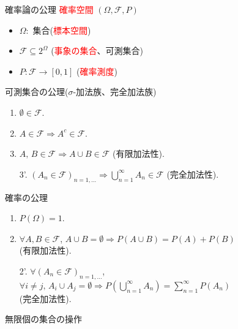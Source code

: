 \documentclass[lualatex,handout]{beamer}
\newcommand{\emm}[1]{\textcolor{red}{#1}}
\theoremstyle{definition}
\begin{document}
\begin{frame}{確率論の公理}
\emm{確率空間} $(\Omega, \mathcal{F}, P)$

\vspace{.5em}
\begin{itemize}
\item $\Omega\colon$ 集合(\emm{標本空間})
\item $\mathcal{F}\subseteq 2^\Omega$ (\emm{事象の集合}、可測集合)
\item $P\colon\mathcal{F}\to[0,1]$ (\emm{確率測度})
\end{itemize}

\vspace{.5em}
可測集合の公理($\sigma$-加法族、完全加法族)
\begin{enumerate}
\item $\emptyset\in\mathcal{F}$.
\item $A\in\mathcal{F}\Longrightarrow A^c\in\mathcal{F}$.
\item $A,\,B\in\mathcal{F}\Longrightarrow A\cup B\in\mathcal{F}$ (有限加法性).
\item[3'.] $(A_n\in\mathcal{F})_{n=1,\dotsc}\Longrightarrow \bigcup_{n=1}^\infty A_n\in\mathcal{F}$ (完全加法性).
\end{enumerate}

\vspace{.5em}
確率の公理
\begin{enumerate}
\item $P(\Omega)=1$.
\item $\forall A, B\in\mathcal{F}$, $A\cup B=\emptyset\Longrightarrow P(A\cup B)=P(A)+P(B)$\\ (有限加法性).
\item[2'.] $\forall (A_n\in\mathcal{F})_{n=1,\dotsc}$, $\forall i\ne j,\, A_i\cup A_j=\emptyset\Longrightarrow P\left(\bigcup_{n=1}^\infty A_n\right)=\sum_{n=1}^\infty P(A_n)$\\ (完全加法性).
\end{enumerate}
\end{frame}

\begin{frame}{無限個の集合の操作}
\end{frame}
\end{document}
